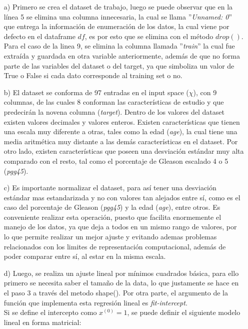 \documentclass[10pt]{article}
\begin{document}
\begin{itemize}
\item[a)] Primero se crea el dataset de trabajo, luego se puede observar que en la línea 5 se elimina una columna innecesaria, la cual se llama ''\textit{Unnamed: 0}'' que entrega la información de enumeración de los datos, la cual viene por defecto en el dataframe $df$, es por esto que se elimina con el método $drop()$. Para el caso de la linea 9, se elimina la columna llamada ''\textit{train}'' la cual fue extraída y guardada en otra variable anteriormente, además de que no forma parte de las variables del dataset o del target, ya que simboliza un valor de True o False si cada dato corresponde al training set o no.

\item[b)] El dataset se conforma de 97 entradas en el input space ($\chi$), con 9 columnas, de las cuales 8 conforman las características de estudio y que predecirán la novena columna (\textit{target}). Dentro de los valores del dataset existen valores decimales y valores enteros. Existen características que tienen una escala muy diferente a otras, tales como la edad (\textit{age}), la cual tiene una media aritmética muy distante a las demás características en el dataset. Por otro lado, existen características que poseen una desviación estándar muy alta comparado con el resto, tal como el porcentaje de Gleason escalado 4 o 5 (\textit{pgg45}).

\item[c)] Es importante normalizar el dataset, para así tener una desviación estándar mas estandarizada y no con valores tan alejados entre sí, como es el caso del porcentaje de Gleason (\textit{pgg45}) y la edad (\textit{age}), entre otros. Es conveniente realizar esta operación, puesto que facilita enormemente el manejo de los datos, ya que deja a todos en un mismo rango de valores, por lo que permite realizar un mejor ajuste y evitando ademas problemas relacionados con los limites de representación computacional, además de poder comparar entre sí, al estar en la misma escala.

\item[d)] Luego, se realiza un ajuste lineal por mínimos cuadrados básica, para ello primero se necesita saber el tamaño de la data, lo que justamente se hace en el paso $3$ a través del metodo shape(). Por otra parte, el argumento de la función que implementa esta regresión lineal es \textit{fit-intercept}.\\

Si se define el intercepto como $x^{(0)} = 1$, se puede definir el siguiente modelo lineal en forma matricial:\\


\end{itemize}
\end{document}

